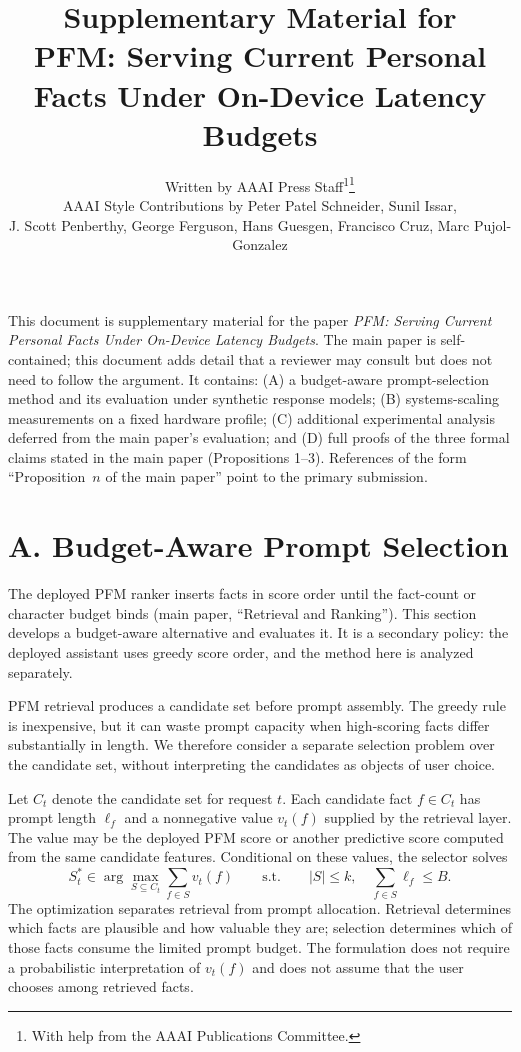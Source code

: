 \documentclass[letterpaper]{article} %
\title{Supplementary Material for\\
PFM: Serving Current Personal Facts Under On-Device Latency Budgets}
\author{
    Written by AAAI Press Staff\textsuperscript{\rm 1}\thanks{With help from the AAAI Publications Committee.}\\
    AAAI Style Contributions by Peter Patel Schneider,
    Sunil Issar,\\
    J. Scott Penberthy,
    George Ferguson,
    Hans Guesgen,
    Francisco Cruz\equalcontrib\corresponding,
    Marc Pujol-Gonzalez\equalcontrib\corresponding
}
\begin{document}
\maketitle

\noindent
This document is supplementary material for the paper \emph{PFM: Serving Current Personal Facts Under On-Device Latency Budgets}. The main paper is self-contained; this document adds detail that a reviewer may consult but does not need to follow the argument. It contains: (A) a budget-aware prompt-selection method and its evaluation under synthetic response models; (B) systems-scaling measurements on a fixed hardware profile; (C) additional experimental analysis deferred from the main paper's evaluation; and (D) full proofs of the three formal claims stated in the main paper (Propositions 1--3). References of the form ``Proposition~$n$ of the main paper'' point to the primary submission.

\section{A. Budget-Aware Prompt Selection}

The deployed PFM ranker inserts facts in score order until the fact-count or character budget binds (main paper, ``Retrieval and Ranking''). This section develops a budget-aware alternative and evaluates it. It is a secondary policy: the deployed assistant uses greedy score order, and the method here is analyzed separately.

PFM retrieval produces a candidate set before prompt assembly. The greedy rule is inexpensive, but it can waste prompt capacity when high-scoring facts differ substantially in length. We therefore consider a separate selection problem over the candidate set, without interpreting the candidates as objects of user choice.

Let $C_t$ denote the candidate set for request $t$. Each candidate fact $f\in C_t$ has prompt length $\ell_f$ and a nonnegative value $v_t(f)$ supplied by the retrieval layer. The value may be the deployed PFM score or another predictive score computed from the same candidate features. Conditional on these values, the selector solves
\begin{equation}
S_t^*\in\arg\max_{S\subseteq C_t}\sum_{f\in S}v_t(f)\qquad\text{s.t.}\qquad |S|\le k,\quad \sum_{f\in S}\ell_f\le B.
\label{eq:budgeted_selection}
\end{equation}
The optimization separates retrieval from prompt allocation. Retrieval determines which facts are plausible and how valuable they are; selection determines which of those facts consume the limited prompt budget. The formulation does not require a probabilistic interpretation of $v_t(f)$ and does not assume that the user chooses among retrieved facts.
\end{document}

